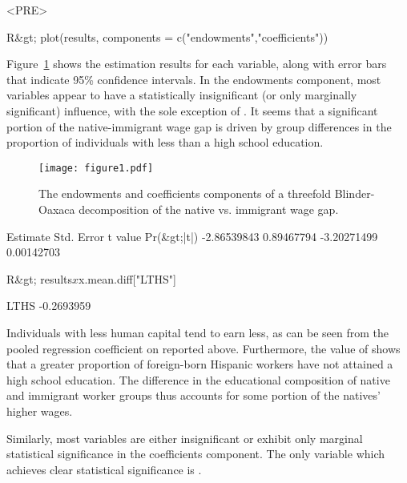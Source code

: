 <PRE>\documentclass[nojss]{jss}
\begin{document}
\begin{CodeInput}
R&gt; plot(results, components = c("endowments","coefficients"))
\end{CodeInput}

Figure~\ref{FigThreefold} shows the estimation results for each variable, along with error bars that indicate 95\% confidence intervals. In the endowments component, most variables appear to have a statistically insignificant (or only marginally significant) influence, with the sole exception of . It seems that a significant portion of the native-immigrant wage gap is driven by group differences in the proportion of individuals with less than a high school education.

\begin{figure}[htp!]
	\centering
	\texttt{[image: figure1.pdf]}
	\caption{The endowments and coefficients components of a threefold Blinder-Oaxaca decomposition of the native vs. immigrant wage gap.}
	\label{FigThreefold}
\end{figure}


\begin{CodeOutput}
   Estimate  Std. Error     t value    Pr(&gt;|t|) 
-2.86539843  0.89467794 -3.20271499  0.00142703
\end{CodeOutput}

\newpage
\begin{CodeInput}
R&gt; results$x$x.mean.diff["LTHS"]
\end{CodeInput}

\begin{CodeOutput}
      LTHS 
-0.2693959
\end{CodeOutput}

Individuals with less human capital tend to earn less, as can be seen from the pooled regression coefficient on  reported above. Furthermore, the value of  shows that a greater proportion of foreign-born Hispanic workers have not attained a high school education. The difference in the educational composition of native and immigrant worker groups thus accounts for some portion of the natives' higher wages.

Similarly, most variables are either insignificant or exhibit only marginal statistical significance in the coefficients component. The only variable which achieves clear statistical significance is .
\end{document}
